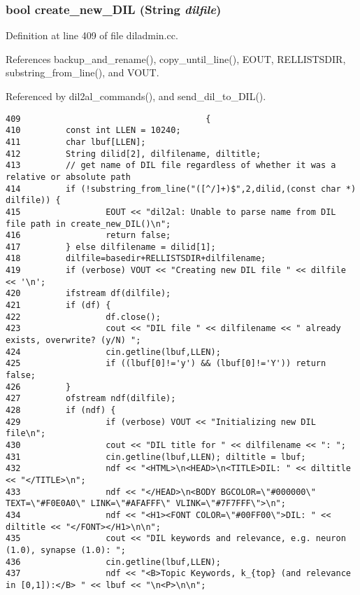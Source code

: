 \subsubsection{\setlength{\rightskip}{0pt plus 5cm}bool create\_\-new\_\-DIL ({\bf String} {\em dilfile})}\label{diladmin_8cc_a4}




Definition at line 409 of file diladmin.cc.

References backup\_\-and\_\-rename(), copy\_\-until\_\-line(), EOUT, RELLISTSDIR, substring\_\-from\_\-line(), and VOUT.

Referenced by dil2al\_\-commands(), and send\_\-dil\_\-to\_\-DIL().



\footnotesize\begin{verbatim}409                                     {
410         const int LLEN = 10240;
411         char lbuf[LLEN];
412         String dilid[2], dilfilename, diltitle;
413         // get name of DIL file regardless of whether it was a relative or absolute path
414         if (!substring_from_line("([^/]+)$",2,dilid,(const char *) dilfile)) {
415                 EOUT << "dil2al: Unable to parse name from DIL file path in create_new_DIL()\n";
416                 return false;
417         } else dilfilename = dilid[1];
418         dilfile=basedir+RELLISTSDIR+dilfilename;
419         if (verbose) VOUT << "Creating new DIL file " << dilfile << '\n';
420         ifstream df(dilfile);
421         if (df) {
422                 df.close();
423                 cout << "DIL file " << dilfilename << " already exists, overwrite? (y/N) ";
424                 cin.getline(lbuf,LLEN);
425                 if ((lbuf[0]!='y') && (lbuf[0]!='Y')) return false;
426         }
427         ofstream ndf(dilfile);
428         if (ndf) {
429                 if (verbose) VOUT << "Initializing new DIL file\n";
430                 cout << "DIL title for " << dilfilename << ": ";
431                 cin.getline(lbuf,LLEN); diltitle = lbuf;
432                 ndf << "<HTML>\n<HEAD>\n<TITLE>DIL: " << diltitle << "</TITLE>\n";
433                 ndf << "</HEAD>\n<BODY BGCOLOR=\"#000000\" TEXT=\"#F0E0A0\" LINK=\"#AFAFFF\" VLINK=\"#7F7FFF\">\n";
434                 ndf << "<H1><FONT COLOR=\"#00FF00\">DIL: " << diltitle << "</FONT></H1>\n\n";
435                 cout << "DIL keywords and relevance, e.g. neuron (1.0), synapse (1.0): ";
436                 cin.getline(lbuf,LLEN);
437                 ndf << "<B>Topic Keywords, k_{top} (and relevance in [0,1]):</B> " << lbuf << "\n<P>\n\n";

\end{verbatim}
